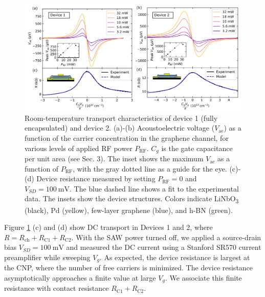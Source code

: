 \documentclass[double,12pt,1in,seploa]{beavtex}
\begin{document}
\begin{figure}
    \includegraphics[width = 1\textwidth]{Figure 2, both devices AE and DC transport data.png}
    \caption{Room-temperature transport characteristics of device 1 (fully encapsulated) and device 2. (a)-(b) Acoustoelectric voltage ($V_{\mathrm{ae}}$) as a function of the carrier concentration in the graphene channel, for various levels of applied RF power $P_{\mathrm{RF}}$. $C_g$ is the gate capacitance per unit area (see Sec. 3). The inset shows the maximum $V_{\mathrm{ae}}$ as a function of $P_{\mathrm{RF}}$, with the gray dotted line as a guide for the eye. (c)-(d) Device resistance measured by setting $P_{\mathrm{RF}} = 0$ and $V_{SD} = \SI{100}{\milli\volt}$. The blue dashed line shows a fit to the experimental data. The insets show the device structures. Colors indicate LiNbO\textsubscript{3} (black), Pd (yellow), few-layer graphene (blue), and h-BN (green).}
    \label{AECP Figure 2}
\end{figure}

Figure \ref{AECP Figure 2} (c) and (d) show DC transport in Devices 1 and 2, where $R = R_{\mathrm{ch}} + R_{\mathrm{C1}} + R_{\mathrm{C2}}$. With the SAW power turned off, we applied a source-drain bias $V_{SD} = \SI{100}{\milli\volt}$ and measured the DC current using a Stanford SR570 current preamplifier while sweeping $V_g$. As expected, the device resistance is largest at the CNP, where the number of free carriers is minimized. The device resistance asymptotically approaches a finite value at large $V_g$. We associate this finite resistance with contact resistance $R_{\mathrm{C1}} + R_{\mathrm{C2}}$.
\end{document}
